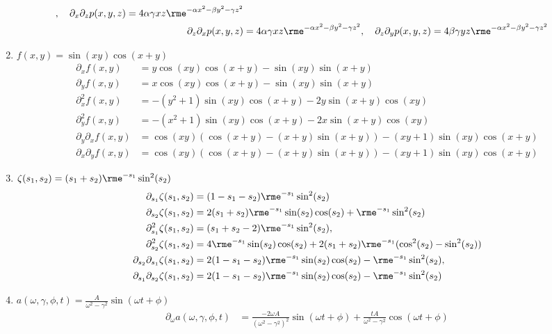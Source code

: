 \documentclass[11pt,answers]{exam}
\begin{document}
\begin{questions}
\begin{solution}
\begin{enumerate}
\begin{align*}
	,\quad
	\partial_x\partial_zp(x,y,z)=4\alpha\gamma xz\rme^{-\alpha x^2-\beta y^2-\gamma z^2}
	\\
	\partial_z\partial_xp(x,y,z)&=4\alpha\gamma xz\rme^{-\alpha x^2-\beta y^2-\gamma z^2}
	,\quad
	\partial_z\partial_yp(x,y,z)=4\beta\gamma yz\rme^{-\alpha x^2-\beta y^2-\gamma z^2}
\end{align*}
\item $f(x,y)=\sin(xy)\cos(x+y)$
\begin{align*}
\partial_xf(x,y)&=y \cos (x y) \cos (x+y)-\sin (x y) \sin (x+y)
\\
\partial_yf(x,y)&=x \cos (x y) \cos (x+y)-\sin (x y) \sin (x+y)
\\
\partial_x^2f(x,y)&=-\left(y^2+1\right) \sin (x y) \cos (x+y)-2 y \sin (x+y) \cos (x y)
\\
\partial_y^2f(x,y)&=-\left(x^2+1\right) \sin (x y) \cos (x+y)-2 x \sin (x+y) \cos (x y)
\\
\partial_y\partial_xf(x,y)&=\cos (x y) (\cos (x+y)-(x+y) \sin (x+y))-(x y+1) \sin (x y) \cos (x+y)
\\
\partial_x\partial_yf(x,y)&=\cos (x y) (\cos (x+y)-(x+y) \sin (x+y))-(x y+1) \sin (x y) \cos (x+y)
\end{align*}
\item $\zeta({s_1},{s_2})=(s_1+s_2)\rme^{-s_1}\sin^2(s_2)$
\begin{align*}
	\partial_{s_1}\zeta(s_1,s_2)&=(1-s_1-s_2)\rme^{-s_1}\sin^2(s_2)
	\\
	\partial_{s_2}\zeta(s_1,s_2)&=2(s_1+s_2)\rme^{-s_1}\sin(s_2)\cos(s_2)+\rme^{-s_1}\sin^2(s_2)
	\\
	\partial_{s_1}^2\zeta(s_1,s_2)&=(s_1+s_2-2)\rme^{-s_1}\sin^2(s_2)
	,\\
	\partial_{s_2}^2\zeta(s_1,s_2)&=4\rme^{-s_1}\sin(s_2)\cos(s_2)+2(s_1+s_2)\rme^{-s_1}(\cos^2(s_2)-\sin^2(s_2))
	\\
	\partial_{s_2}\partial_{s_1}\zeta(s_1,s_2)&=2(1-s_1-s_2)\rme^{-s_1}\sin(s_2)\cos(s_2)-\rme^{-s_1}\sin^2(s_2)
	,\\
	\partial_{s_1}\partial_{s_2}\zeta(s_1,s_2)&=2(1-s_1-s_2)\rme^{-s_1}\sin(s_2)\cos(s_2)-\rme^{-s_1}\sin^2(s_2)
\end{align*}
\item $a(\omega,\gamma,\phi,t)=\frac{A}{\omega^2-\gamma^2}\sin(\omega t+\phi)$
\begin{align*}
	\partial_\omega a(\omega,\gamma,\phi,t)&=\frac{-2\omega A}{(\omega^2-\gamma^2)^2}\sin(\omega t+\phi)+\frac{t A}{\omega^2-\gamma^2}\cos(\omega t+\phi)
	\\

\end{align*}
\end{enumerate}
\end{solution}
\end{questions}
\end{document}
